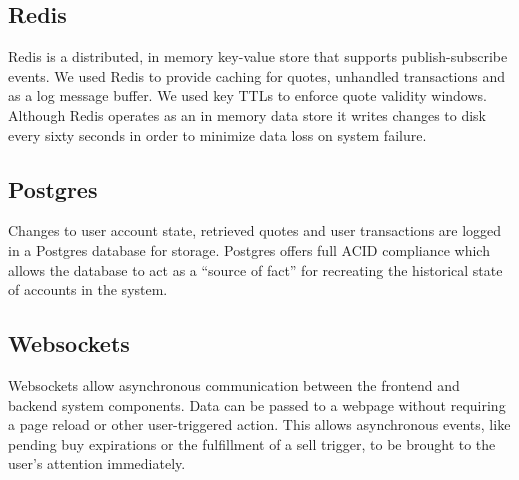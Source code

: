 \subsection{Redis}
Redis is a distributed, in memory key-value store that supports publish-subscribe events.
We used Redis to provide caching for quotes, unhandled transactions and as a log message buffer.
We used key TTLs to enforce quote validity windows.
Although Redis operates as an in memory data store it writes changes to disk every sixty seconds in order to minimize data loss on system failure.

\subsection{Postgres}
Changes to user account state, retrieved quotes and user transactions are logged in a Postgres database for storage.
Postgres offers full ACID compliance which allows the database to act as a ``source of fact'' for recreating the historical state of accounts in the system.

\subsection{Websockets} 
Websockets allow asynchronous communication between the frontend and backend system components.
Data can be passed to a webpage without requiring a page reload or other user-triggered action.
This allows asynchronous events, like pending buy expirations or the fulfillment of a sell trigger, to be brought to the user's attention immediately.
